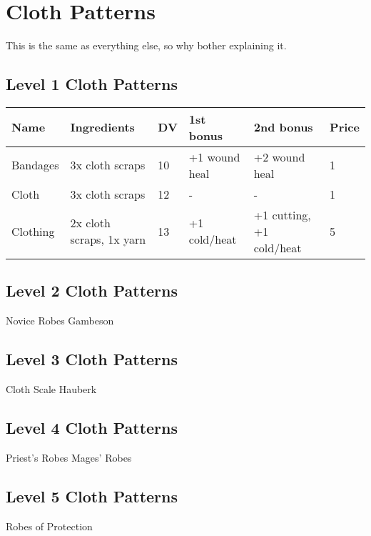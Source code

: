 \section{Cloth Patterns}
This is the same as everything else, so why bother explaining it.
	
\subsection{Level 1 Cloth Patterns}
\begin{longtable}{p{1.5cm} | p{2.5cm} | l | p{2cm} | p{2cm} | p{1cm} }
	Name & Ingredients & DV  & 1st bonus & 2nd bonus & Price\\ \hline
	Bandages & 3x cloth scraps & 10 & +1 wound heal & +2 wound heal & 1\\
	Cloth & 3x cloth scraps & 12 & - & - & 1\\
	Clothing & 2x cloth scraps, 1x yarn & 13 & +1 cold/heat & +1 cutting, +1 cold/heat & 5\\
\end{longtable}


\subsection{Level 2 Cloth Patterns}
Novice Robes
Gambeson


\subsection{Level 3 Cloth Patterns}
Cloth Scale Hauberk


\subsection{Level 4 Cloth Patterns}
Priest's Robes
Mages' Robes


\subsection{Level 5 Cloth Patterns}
Robes of Protection